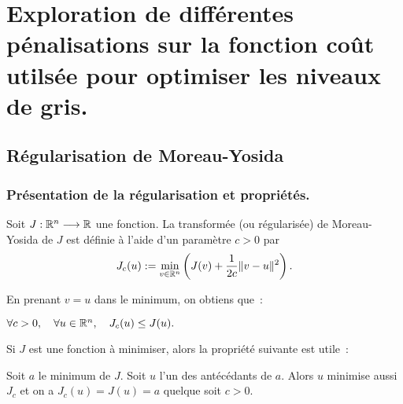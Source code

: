 \documentclass[main.tex]{subfiles}
\begin{document}
\chapter{Exploration de différentes pénalisations sur la fonction coût utilsée pour optimiser les niveaux de gris. \label{chap:anx_penalisation} }

\section{Régularisation de Moreau-Yosida}
\subsection{Présentation de la régularisation et propriétés.}
\begin{dfn}\label{dfn:moreau_yosida}
Soit $J : \mathbb{R}^n \longrightarrow \mathbb{R}$ une fonction. La transformée (ou régularisée) de Moreau-Yosida de $J$ est définie à l'aide d'un paramètre $c>0$ par
\begin{equation}
J_c(u) := \min_{v\in \mathbb{R}^n} \left( J(v) + \frac{1}{2c} \|v-u\|^2 \right).
\end{equation}
\end{dfn}
\noindent En prenant $v=u$ dans le minimum, on obtiens que~:
\begin{prop}
$\forall c>0, \quad \forall u \in \mathbb{R}^n, \quad J_c(u) \leq J(u) .$
\end{prop}
\noindent Si $J$ est une fonction à minimiser, alors la propriété suivante est utile~:
\begin{prop}
Soit $a$ le minimum de $J$. Soit $u$ l'un des antécédants de $a$. Alors $u$ minimise aussi $J_c$ et on a $J_c(u)=J(u)=a$ quelque soit $c>0$.
\end{prop}
\end{document}
